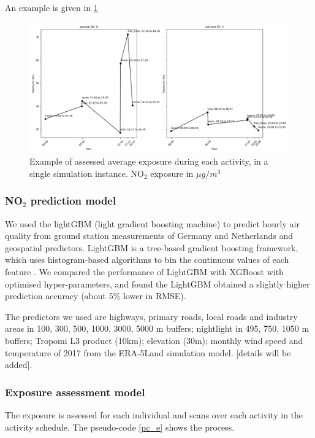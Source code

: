 \documentclass[]{article}
\begin{document}
An example is given in \cref{exp_act}
\begin{figure}[!h]
    \centering
    \includegraphics[width=12cm]{figure/exposure_act1.png}
    \caption{Example of assessed average exposure during each activity, in a single simulation instance. NO$_2$ exposure in $\mu g/m^3$ }
    \label{exp_act}
\end{figure}

\subsubsection{NO$_2$ prediction model}
We used the lightGBM (light gradient boosting machine) \citep{ke2017lightgbm} to predict hourly air quality from ground station measurements of Germany and Netherlands and geospatial predictors. LightGBM is a tree-based gradient boosting framework, which uses histogram-based algorithms to bin the continuous values of each feature \citep{ke2017lightgbm}. We compared the performance of LightGBM with XGBoost \citep{chen2015xgboost} with optimised hyper-parameters, and found the LightGBM obtained a slightly higher prediction accuracy (about 5\% lower in RMSE).

The predictors we used are highways, primary roads, local roads and industry areas in 100, 300, 500, 1000, 3000, 5000 m buffers; nightlight in 495, 750, 1050 m buffers; Tropomi L3 product (10km); elevation (30m); monthly wind speed and temperature of 2017 from the ERA-5Land simulation model. [details will be added].


\subsubsection{Exposure assessment model}
The exposure is assessed for each individual and scans over each activity in the activity schedule. The pseudo-code \cref{pc_e} shows the process. 
 
\end{document}
